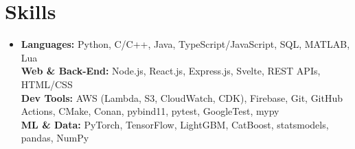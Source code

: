 \documentclass[letterpaper,11pt]{article}
\begin{document}
\section{Skills}
  \begin{itemize}[leftmargin=0pt,labelsep=0pt,label={},topsep=2pt]
    \small\item{
      \textbf{Languages:} Python, C/C++, Java, TypeScript/JavaScript, SQL, MATLAB, Lua \\
      \textbf{Web \& Back-End:} Node.js, React.js, Express.js, Svelte, REST APIs, HTML/CSS \\
      \textbf{Dev Tools:} AWS (Lambda, S3, CloudWatch, CDK), Firebase, Git, GitHub Actions, CMake, Conan, pybind11, pytest, GoogleTest, mypy \\
      \textbf{ML \& Data:} PyTorch, TensorFlow, LightGBM, CatBoost, statsmodels, pandas, NumPy
    }
  \end{itemize}
\end{document}

